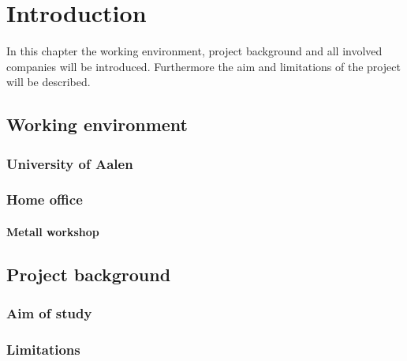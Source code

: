 \chapter{Introduction}
\label{introductio}

In this chapter the working environment, project background and all involved companies will be introduced. Furthermore the aim and limitations of the project will be described. 

\section{Working environment}
\subsection{University of Aalen}

\subsection{Home office}

\subsubsection{Metall workshop}


\section{Project background}
\subsection{Aim of study}
\subsection{Limitations}
